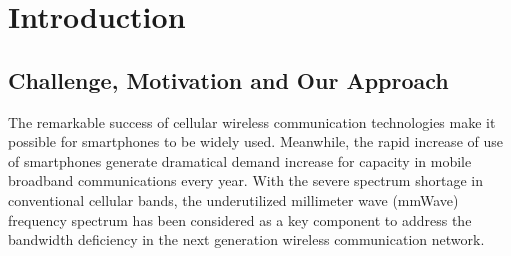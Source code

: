 \chapter{Introduction}\label{ch:Intro}
\section{Challenge, Motivation and Our Approach}
\par The remarkable success of cellular wireless communication technologies make it possible for smartphones to be widely used. Meanwhile, the rapid increase of use of smartphones  generate dramatical demand increase for capacity in mobile broadband communications every year. With the severe spectrum shortage in conventional cellular bands, the underutilized millimeter wave (mmWave) frequency spectrum has been considered as a key component to address the bandwidth deficiency in the next generation wireless communication network. 
